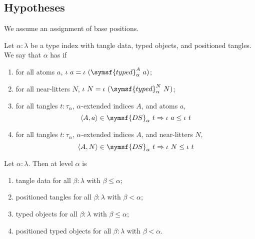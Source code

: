 \subsection{Hypotheses}

We assume an assignment of base positions.
\begin{definition}
    \label{def:PositionedTypedObjects}
    Let \( \alpha : \lambda \) be a type index with tangle data, typed objects, and positioned tangles.
    We say that \( \alpha \) has  if
    \begin{enumerate}
        \item for all atoms \( a \), \( \iota\ a = \iota\ (\symsf{typed}^A_\alpha\ a) \);
        \item for all near-litters \( N \), \( \iota\ N = \iota\ (\symsf{typed}^N_\alpha\ N) \);
        \item for all tangles \( t : \tau_\alpha \), \( \alpha \)-extended indices \( A \), and atoms \( a \),
        \[ \langle A, a \rangle \in \symsf{DS}_\alpha\ t \Rightarrow \iota\ a \leq \iota\ t \]
        \item for all tangles \( t : \tau_\alpha \), \( \alpha \)-extended indices \( A \), and near-litters \( N \),
        \[ \langle A, N \rangle \in \symsf{DS}_\alpha\ t \Rightarrow \iota\ N \leq \iota\ t \]
    \end{enumerate}
\end{definition}
\begin{definition}
    Let \( \alpha : \lambda \).
    Then  at level \( \alpha \) is
    \begin{enumerate}
        \item tangle data for all \( \beta : \lambda \) with \( \beta \leq \alpha \);
        \item positioned tangles for all \( \beta : \lambda \) with \( \beta < \alpha \);
        \item typed objects for all \( \beta : \lambda \) with \( \beta \leq \alpha \);
        \item positioned typed objects for all \( \beta : \lambda \) with \( \beta < \alpha \).
    \end{enumerate}
\end{definition}
